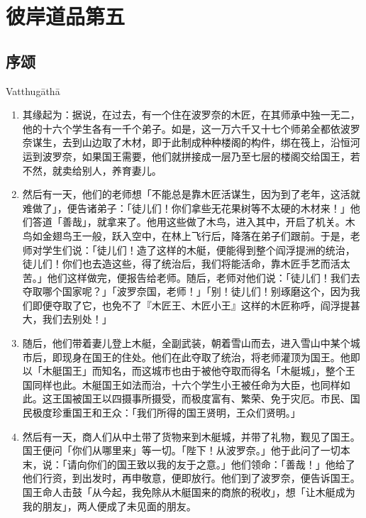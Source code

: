 \chapter{彼岸道品第五}

\section{序颂}

\begin{center}Vatthugāthā\end{center}\vspace{1em}

\begin{enumerate}\item 其缘起为：据说，在过去，有一个住在波罗奈的木匠，在其师承中独一无二，他的十六个学生各有一千个弟子。如是，这一万六千又十七个师弟全都依波罗奈谋生，去到山边取了木材，即于此制成种种楼阁的构件，绑在筏上，沿恒河运到波罗奈，如果国王需要，他们就拼接成一层乃至七层的楼阁交给国王，若不然，就卖给别人，养育妻儿。
\item 然后有一天，他们的老师想「不能总是靠木匠活谋生，因为到了老年，这活就难做了」，便告诸弟子：「徒儿们！你们拿些无花果树等不太硬的木材来！」他们答道「善哉」，就拿来了。他用这些做了木鸟，进入其中，开启了机关。木鸟如金翅鸟王一般，跃入空中，在林上飞行后，降落在弟子们跟前。于是，老师对学生们说：「徒儿们！造了这样的木艇，便能得到整个阎浮提洲的统治，徒儿们！你们也去造这些，得了统治后，我们将能活命，靠木匠手艺而活太苦。」他们这样做完，便报告给老师。随后，老师对他们说：「徒儿们！我们去夺取哪个国家呢？」「波罗奈国，老师！」「别！徒儿们！别琢磨这个，因为我们即便夺取了它，也免不了『木匠王、木匠小王』这样的木匠称呼，阎浮提甚大，我们去别处！」
\item 随后，他们带着妻儿登上木艇，全副武装，朝着雪山而去，进入雪山中某个城市后，即现身在国王的住处。他们在此夺取了统治，将老师灌顶为国王。他即以「木艇国王」而知名，而这城市也由于被他夺取而得名「木艇城」，整个王国同样也此。木艇国王如法而治，十六个学生小王被任命为大臣，也同样如此。这王国被国王以四摄事所摄受，而极度富有、繁荣、免于灾厄。市民、国民极度珍重国王和王众：「我们所得的国王贤明，王众们贤明。」
\item 然后有一天，商人们从中土带了货物来到木艇城，并带了礼物，觐见了国王。国王便问「你们从哪里来」等一切。「陛下！从波罗奈。」他于此问了一切本末，说：「请向你们的国王致以我的友于之意。」他们领命：「善哉！」他给了他们行资，到出发时，再申敬意，便即放行。他们到了波罗奈，便告诉国王。国王命人击鼓「从今起，我免除从木艇国来的商旅的税收」，想「让木艇成为我的朋友」，两人便成了未见面的朋友。

\end{enumerate}
